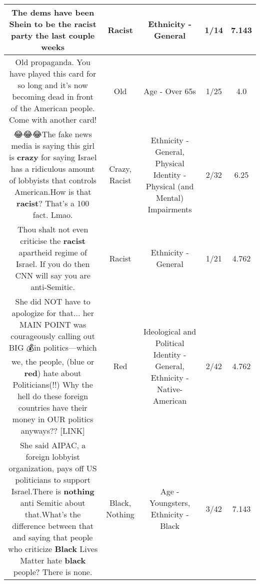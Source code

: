 \documentclass[11pt]{article}
\newlength\mylength
\begin{document}
\begin{center}
\begin{longtable}{|C{.65\mylength}|C{.30\mylength}|C{.12\mylength}|C{.12\mylength}|C{.12\mylength}|}
  \small The dems have been Shein to be the \textbf{racist} party the last couple weeks\normalsize   & Racist & Ethnicity - General & 1/14 & 7.143 \\  \hline
  \small Old propaganda.  You have played this card for so long and it's now becoming dead in front of the American people. Come with another card!\normalsize   & Old & Age - Over 65s & 1/25 & 4.0 \\  \hline
  \small 😂😂😂The fake news media is saying this girl is \textbf{crazy} for saying Israel has a ridiculous amount of lobbyists that controls American.How is that \textbf{racist}? That's a 100 fact. Lmao.\normalsize   & Crazy, Racist & Ethnicity - General, Physical Identity - Physical (and Mental) Impairments & 2/32 & 6.25 \\  \hline
  \small Thou shalt not even criticise the \textbf{racist} apartheid regime of Israel. If you do then CNN will say you are anti-Semitic.\normalsize   & Racist & Ethnicity - General & 1/21 & 4.762 \\  \hline
  \small She did NOT have to apologize for that... her MAIN POINT was courageously calling out BIG 💰in politics—which we, the people, (blue or \textbf{r\textbf{ed}}) hate about Politicians(!!) Why the hell do these foreign countries have their money in OUR politics anyways??  [LINK] \normalsize   & Red &  Ideological and Political Identity - General, Ethnicity - Native-American & 2/42 & 4.762 \\  \hline
  \small {} She said AIPAC, a foreign lobbyist organization, pays off US politicians to support Israel.There is \textbf{nothing} anti Semitic about that.What's the difference between that and saying that people who criticize \textbf{Black} Lives Matter hate \textbf{black} people? There is none.\normalsize   & Black, Nothing & Age - Youngsters, Ethnicity - Black & 3/42 & 7.143 \\  \hline

\end{longtable}
\end{center}
\end{document}
